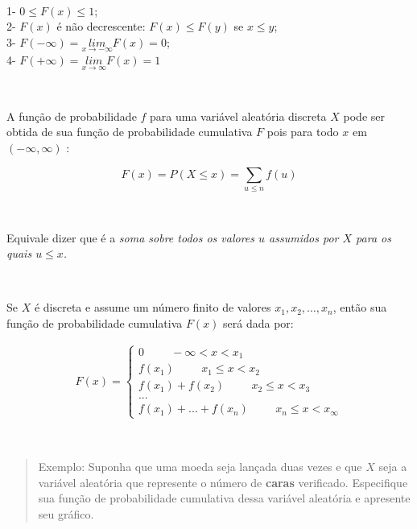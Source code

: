 \documentclass[
]{book}
\begin{document}
~

1- \(0 \leq F(x) \leq 1\);\\
2- \(F(x)\) é não decrescente: \(F(x) \leq F(y)\) se \(x \leq y\);\\
3- \(F(- \infty) = \underset{x\to -\infty }{lim}F\left(x\right)=0\);\\
4- \(F(+ \infty) = \underset{x\to \infty }{lim}F\left(x\right)=1\)

~

A função de probabilidade \(f\) para uma variável aleatória discreta \(X\) pode ser obtida de sua função de probabilidade cumulativa \(F\) pois para todo \(x\) em \((-\infty, \infty)\) :

\hfill\break

\[
F\left(x\right)=P\left(X\le x\right)=\sum _{u\le n}f\left(u\right)
\]

~

Equivale dizer que é a \emph{soma sobre todos os valores \(u\) assumidos por \(X\) para os quais \(u \leq x\).}

~

Se \(X\) é discreta e assume um número finito de valores \(x_{1},x_{2}, \dots, x_{n}\), então sua função de probabilidade cumulativa \(F(x)\) será dada por:

\hfill\break

\begin{align}   
F(x)=
\begin{cases}
        0 \hspace{1cm} -\infty < x < x_{1} \\
        f(x_{1}) \hspace{1cm} x_{1} \leq x <  x_{2}  \\
        f(x_{1}) + f(x_{2}) \hspace{1cm} x_{2} \leq x <  x_{3}  \\
        ...                    \\
        f(x_{1}) + ...+ f(x_{n}) \hspace{1cm} x_{n} \leq x <  x_{\infty}
\end{cases}
\end{align}

~

\begin{quote}
Exemplo: Suponha que uma moeda seja lançada duas vezes e que \(X\) seja a variável aleatória que represente o número de \textbf{caras} verificado. Especifique sua função de probabilidade cumulativa dessa variável aleatória e apresente seu gráfico.
\end{quote}
\end{document}
